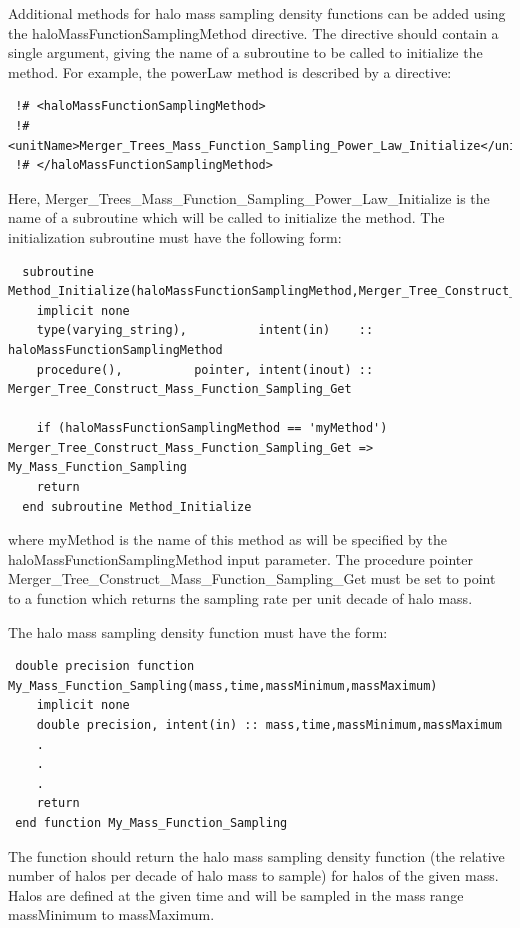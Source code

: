 Additional methods for halo mass sampling density functions can be added using the {\normalfont \ttfamily haloMassFunctionSamplingMethod} directive. The directive should contain a single argument, giving the name of a subroutine to be called to initialize the method. For example, the {\normalfont \ttfamily powerLaw} method is described by a directive:
\begin{verbatim}
 !# <haloMassFunctionSamplingMethod>
 !#  <unitName>Merger_Trees_Mass_Function_Sampling_Power_Law_Initialize</unitName>
 !# </haloMassFunctionSamplingMethod>
\end{verbatim}
Here, {\normalfont \ttfamily Merger\_Trees\_Mass\_Function\_Sampling\_Power\_Law\_Initialize} is the name of a subroutine which will be called to initialize the method. The initialization subroutine must have the following form:
\begin{verbatim}
  subroutine Method_Initialize(haloMassFunctionSamplingMethod,Merger_Tree_Construct_Mass_Function_Sampling_Get)
    implicit none
    type(varying_string),          intent(in)    :: haloMassFunctionSamplingMethod
    procedure(),          pointer, intent(inout) :: Merger_Tree_Construct_Mass_Function_Sampling_Get
    
    if (haloMassFunctionSamplingMethod == 'myMethod') Merger_Tree_Construct_Mass_Function_Sampling_Get => My_Mass_Function_Sampling
    return
  end subroutine Method_Initialize
\end{verbatim}
where {\normalfont \ttfamily myMethod} is the name of this method as will be specified by the {\normalfont \ttfamily haloMassFunctionSamplingMethod} input parameter. The procedure pointer {\normalfont \ttfamily Merger\_Tree\_Construct\_Mass\_Function\_Sampling\_Get} must be set to point to a function which returns the sampling rate per unit decade of halo mass.

The halo mass sampling density function must have the form:
\begin{verbatim}
 double precision function My_Mass_Function_Sampling(mass,time,massMinimum,massMaximum)
    implicit none
    double precision, intent(in) :: mass,time,massMinimum,massMaximum
    .
    .
    .
    return
 end function My_Mass_Function_Sampling
\end{verbatim}
The function should return the halo mass sampling density function (the relative number of halos per decade of halo mass to sample) for halos of the given {\normalfont \ttfamily mass}. Halos are defined at the given {\normalfont \ttfamily time} and will be sampled in the mass range {\normalfont \ttfamily massMinimum} to {\normalfont \ttfamily massMaximum}.

